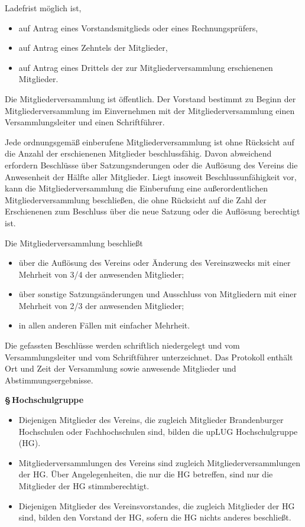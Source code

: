 \documentclass[11pt]{article}
\def\items#1{{%
  \itcounter0%
  \begin{itemize}
  #1
  \end{itemize}
}}
\let\it\item%
\def\item{
  \advance\itcounter1%
  \it[(\the\itcounter)]
}
\def\paragraf#1{
  \advance\itcounter1%
  \par\medskip
  {\large\bfseries \S\,\the\itcounter\quad#1}
  \par\smallskip
}
\begin{document}
{       Ladefrist m{\"o}glich ist,
      \items{
        \item auf Antrag eines Vorstandsmitglieds oder eines Rechnungspr{\"u}fers,
        \item auf Antrag eines Zehntels der Mitglieder,
        \item auf Antrag eines Drittels der zur Mitgliederversammlung erschienenen Mitglieder.
       }
   \item
       Die Mitgliederversammlung ist {\"o}ffentlich. Der Vorstand bestimmt zu Beginn der Mitglieder\-ver\-sammlung
       im Einvernehmen mit der Mitgliederversammlung einen Versammlungsleiter und einen Schriftf{\"u}hrer.
   \item 
         Jede ordnungsgem{\"a}{\ss} einberufene Mitgliederversammlung ist ohne R{\"u}cksicht auf
         die Anzahl der erschienenen Mitglieder beschlussf{\"a}hig.
         Davon abweichend erfordern Beschl{\"u}sse {\"u}ber Satzungsnderungen oder
         die Aufl{\"o}sung des Vereins die
         Anwesenheit der H{\"a}lfte aller Mitglieder. Liegt insoweit Beschlussunf{\"a}higkeit
         vor, kann die Mitgliederversammlung die Einberufung eine au{\ss}erordentlichen
         Mitgliederversammlung beschlie{\ss}en, die ohne R{\"u}cksicht auf die Zahl der Erschienenen zum
         Beschluss {\"u}ber die neue Satzung oder die Aufl{\"o}sung berechtigt ist.
   \item
     Die Mitgliederversammlung beschlie{\ss}t
     \items{
       \item {\"u}ber die Aufl{\"o}sung des Vereins oder {\"A}nderung des Vereinszwecks mit  einer
              Mehrheit von 3/4 der anwesenden Mitglieder;
       \item {\"u}ber sonstige Satzungs{\"a}nderungen und Ausschluss von Mitgliedern mit einer Mehrheit von
                2/3 der anwesenden Mitglieder;
       \item in allen anderen F{\"a}llen mit einfacher Mehrheit.
     }
   \item Die gefassten Beschl{\"u}sse werden schriftlich niedergelegt und vom
        Versammlungsleiter und vom Schriftf{\"u}hrer unterzeichnet. Das Protokoll enth{\"a}lt
        Ort und Zeit der Versammlung sowie anwesende Mitglieder und Abstimmungsergebnisse.
}



\paragraf{Hochschulgruppe}

\items{
  \item
    Diejenigen Mitglieder des Vereins, die zugleich Mitglieder Brandenburger Hochschulen oder
    Fachhochschulen sind, bilden die \glqq upLUG Hochschulgruppe\grqq{} (HG).
  \item
    Mitgliederversammlungen des Vereins sind zugleich Mitgliederversammlungen der HG.
    {\"U}ber Angelegenheiten, die nur die HG betreffen, sind nur die Mitglieder der HG
    stimmberechtigt.
  \item
    Diejenigen Mitglieder des Vereinsvorstandes, die zugleich
    Mitglieder der HG sind, bilden den Vorstand der HG, sofern die HG nichts anderes beschlie{\ss}t.
}
\end{document}
